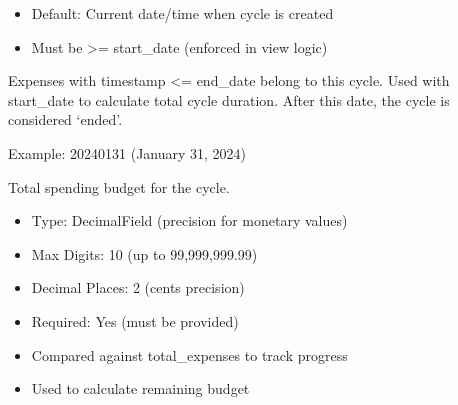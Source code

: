 \documentclass[letterpaper,10pt,english]{sphinxmanual}
\begin{document}
\begin{fulllineitems}
\begin{fulllineitems}
\begin{description}
\begin{itemize}
\item {} 
\sphinxAtStartPar
Default: Current date/time when cycle is created

\item {} 
\sphinxAtStartPar
Must be \textgreater{}= start\_date (enforced in view logic)

\end{itemize}

\sphinxAtStartPar
Expenses with timestamp \textless{}= end\_date belong to this cycle.
Used with start\_date to calculate total cycle duration.
After this date, the cycle is considered ‘ended’.

\end{description}

\sphinxAtStartPar
Example: 2024\sphinxhyphen{}01\sphinxhyphen{}31 (January 31, 2024)

\end{fulllineitems}


\begin{fulllineitems}
\label{\detokenize{expensesApp:id8}}
\pysigstartsignatures
\pysigline
{}
\pysigstopsignatures
\sphinxAtStartPar
Total spending budget for the cycle.
\begin{description}
\begin{itemize}
\item {} 
\sphinxAtStartPar
Type: DecimalField (precision for monetary values)

\item {} 
\sphinxAtStartPar
Max Digits: 10 (up to 99,999,999.99)

\item {} 
\sphinxAtStartPar
Decimal Places: 2 (cents precision)

\item {} 
\sphinxAtStartPar
Required: Yes (must be provided)

\end{itemize}

\begin{itemize}
\item {} 
\sphinxAtStartPar
Compared against total\_expenses to track progress

\item {} 
\sphinxAtStartPar
Used to calculate remaining budget


\end{itemize}
\end{description}
\end{fulllineitems}
\end{fulllineitems}
\end{document}
